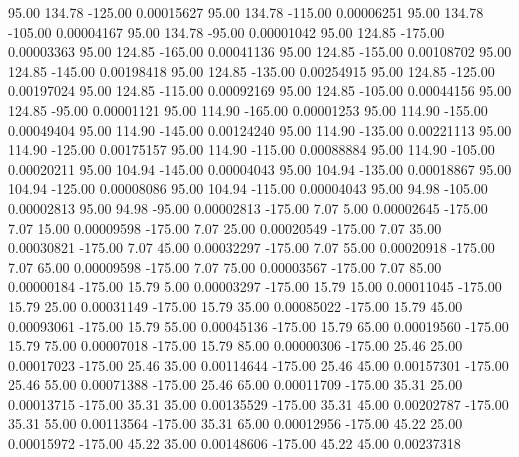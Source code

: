      95.00    134.78   -125.00     0.00015627
     95.00    134.78   -115.00     0.00006251
     95.00    134.78   -105.00     0.00004167
     95.00    134.78    -95.00     0.00001042
     95.00    124.85   -175.00     0.00003363
     95.00    124.85   -165.00     0.00041136
     95.00    124.85   -155.00     0.00108702
     95.00    124.85   -145.00     0.00198418
     95.00    124.85   -135.00     0.00254915
     95.00    124.85   -125.00     0.00197024
     95.00    124.85   -115.00     0.00092169
     95.00    124.85   -105.00     0.00044156
     95.00    124.85    -95.00     0.00001121
     95.00    114.90   -165.00     0.00001253
     95.00    114.90   -155.00     0.00049404
     95.00    114.90   -145.00     0.00124240
     95.00    114.90   -135.00     0.00221113
     95.00    114.90   -125.00     0.00175157
     95.00    114.90   -115.00     0.00088884
     95.00    114.90   -105.00     0.00020211
     95.00    104.94   -145.00     0.00004043
     95.00    104.94   -135.00     0.00018867
     95.00    104.94   -125.00     0.00008086
     95.00    104.94   -115.00     0.00004043
     95.00     94.98   -105.00     0.00002813
     95.00     94.98    -95.00     0.00002813
   -175.00      7.07      5.00     0.00002645
   -175.00      7.07     15.00     0.00009598
   -175.00      7.07     25.00     0.00020549
   -175.00      7.07     35.00     0.00030821
   -175.00      7.07     45.00     0.00032297
   -175.00      7.07     55.00     0.00020918
   -175.00      7.07     65.00     0.00009598
   -175.00      7.07     75.00     0.00003567
   -175.00      7.07     85.00     0.00000184
   -175.00     15.79      5.00     0.00003297
   -175.00     15.79     15.00     0.00011045
   -175.00     15.79     25.00     0.00031149
   -175.00     15.79     35.00     0.00085022
   -175.00     15.79     45.00     0.00093061
   -175.00     15.79     55.00     0.00045136
   -175.00     15.79     65.00     0.00019560
   -175.00     15.79     75.00     0.00007018
   -175.00     15.79     85.00     0.00000306
   -175.00     25.46     25.00     0.00017023
   -175.00     25.46     35.00     0.00114644
   -175.00     25.46     45.00     0.00157301
   -175.00     25.46     55.00     0.00071388
   -175.00     25.46     65.00     0.00011709
   -175.00     35.31     25.00     0.00013715
   -175.00     35.31     35.00     0.00135529
   -175.00     35.31     45.00     0.00202787
   -175.00     35.31     55.00     0.00113564
   -175.00     35.31     65.00     0.00012956
   -175.00     45.22     25.00     0.00015972
   -175.00     45.22     35.00     0.00148606
   -175.00     45.22     45.00     0.00237318
